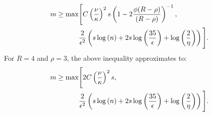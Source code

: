 \begin{align}
m \geq \max & \Bigg[ C\left(\frac{\nu}{\kappa}\right)^2s \left(1-2\frac{\phi(R-\rho)}{(R-\rho)} \right)^{-1}, \nonumber \\ 
& \frac{2}{\eps^2}\left(s\log{(n)} + 2s\log{\left(\frac{35}{\eps}\right)}+\log{\left(\frac{2}{\eta}\right)}\right)\Bigg].
\label{eq:ineq4}
\end{align}
For $R=4$ and $\rho =3$, the above inequality approximates to:
\begin{align*}
m \geq \max & \Bigg[ 2C\left(\frac{\nu}{\kappa}\right)^2s, \nonumber \\ 
& \frac{2}{\epsilon^2}\left(s\log{(n)} + 2s\log{\left(\frac{35}{\epsilon}\right)}+\log{\left(\frac{2}{\eta}\right)}\right)\Bigg].
\end{align*}
